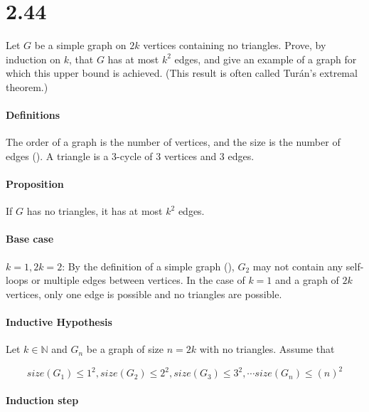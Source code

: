 \documentclass[11pt]{article}
\begin{document}

\section*{2.44}

Let $G$ be a simple graph on $2k$ vertices containing no triangles.
Prove, by induction on $k$, that $G$ has at most $k^2$ edges, and give an example of a graph for which this upper bound is achieved.
(This result is often called Turán’s extremal theorem.)

\paragraph{Definitions}

The order of a graph is the number of vertices, and the size is the number of edges (\cite{chart}).
A triangle is a 3-cycle of 3 vertices and 3 edges.

\paragraph{Proposition}

If $G$ has no triangles, it has at most $k^2$ edges.

\paragraph{Base case}

$k=1, 2k=2$: By the definition of a simple graph (\cite{wilson}), $G_2$ may not contain any self-loops or multiple edges between vertices.
In the case of $k=1$ and a graph of $2k$ vertices, only one edge is possible and no triangles are possible.

\paragraph{Inductive Hypothesis}

Let $k \in \mathbb{N}$ and $G_n$ be a graph of size $n=2k$ with no triangles. Assume that

$$size(G_1) \le 1^2, size(G_2) \le 2^2, size(G_3) \le 3^2, \cdots size(G_{n}) \le (n)^2$$

\paragraph{Induction step}
\end{document}
